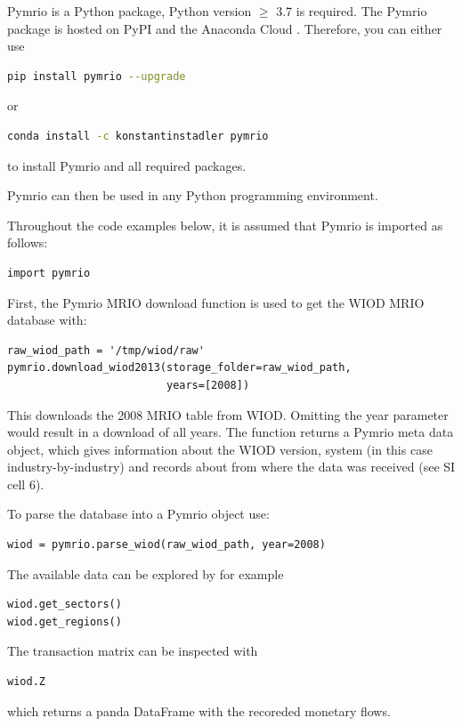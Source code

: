 \documentclass{jors}
\begin{document}
Pymrio is a Python \cite{python2018} package, Python version  $\geq$ 3.7 is required.
The Pymrio package is hosted on PyPI  \cite{pypi2018}  and the Anaconda Cloud \cite{anacondainc.2018}.
Therefore, you can either use
\begin{lstlisting}[language=Bash]
pip install pymrio --upgrade
\end{lstlisting}
or
\begin{lstlisting}[language=Bash]
conda install -c konstantinstadler pymrio
\end{lstlisting}

to install Pymrio and all required packages.

Pymrio can then be used in any Python programming environment.

Throughout the code examples below, it is assumed that Pymrio is imported as follows: 

\begin{lstlisting}
import pymrio
\end{lstlisting}

First, the Pymrio MRIO download function is used to get the WIOD MRIO database with:
\begin{lstlisting}
raw_wiod_path = '/tmp/wiod/raw'
pymrio.download_wiod2013(storage_folder=raw_wiod_path,
                         years=[2008])
\end{lstlisting}

This downloads the 2008 MRIO table from WIOD. Omitting the year parameter would result in a download of all years.
The function returns a Pymrio meta data object, which gives information about the WIOD version, system (in this case industry-by-industry) and records about from where the data was received (see SI cell 6).

To parse the database into a Pymrio object use:
\begin{lstlisting}
wiod = pymrio.parse_wiod(raw_wiod_path, year=2008)
\end{lstlisting}

The available data can be explored by for example
\begin{lstlisting}
wiod.get_sectors()
wiod.get_regions()
\end{lstlisting}

The transaction matrix can be inspected with
\begin{lstlisting}
wiod.Z
\end{lstlisting}

which returns a panda DataFrame with the recoreded monetary flows.
\end{document}
